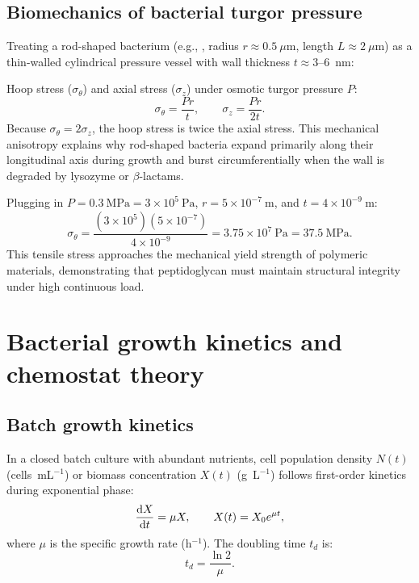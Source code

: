 \documentclass[12pt, a4paper, oneside]{report}
\begin{document}
\subsection{Biomechanics of bacterial turgor pressure}

Treating a rod-shaped bacterium (e.g., \Ecoli, radius $r \approx 0.5~\mu\text{m}$, length $L \approx 2~\mu\text{m}$) as a thin-walled cylindrical pressure vessel with wall thickness $t \approx 3$--$6$~nm:

Hoop stress ($\sigma_\theta$) and axial stress ($\sigma_z$) under osmotic turgor pressure $P$:
\begin{equation}
  \sigma_\theta = \frac{P r}{t}, \qquad \sigma_z = \frac{P r}{2t}.
  \label{eq:stress}
\end{equation}
Because $\sigma_\theta = 2\sigma_z$, the hoop stress is twice the axial stress. This mechanical anisotropy explains why rod-shaped bacteria expand primarily along their longitudinal axis during growth and burst circumferentially when the wall is degraded by lysozyme or $\beta$-lactams.

Plugging in $P = 0.3~\text{MPa} = 3 \times 10^5~\text{Pa}$, $r = 5 \times 10^{-7}~\text{m}$, and $t = 4 \times 10^{-9}~\text{m}$:
\[
  \sigma_\theta = \frac{(3\times 10^5)(5\times 10^{-7})}{4\times 10^{-9}} = 3.75 \times 10^7~\text{Pa} = 37.5~\text{MPa}.
\]
This tensile stress approaches the mechanical yield strength of polymeric materials, demonstrating that peptidoglycan must maintain structural integrity under high continuous load.

\section{Bacterial growth kinetics and chemostat theory}

\subsection{Batch growth kinetics}

In a closed batch culture with abundant nutrients, cell population density $N(t)$ (cells~mL$^{-1}$) or biomass concentration $X(t)$ (g~L$^{-1}$) follows first-order kinetics during exponential phase:
\begin{equation}
  \frac{\mathrm{d}X}{\mathrm{d}t} = \mu X, \qquad X(t) = X_0 e^{\mu t},
  \label{eq:exp_growth}
\end{equation}
where $\mu$ is the specific growth rate (h$^{-1}$). The doubling time $t_d$ is:
\begin{equation}
  t_d = \frac{\ln 2}{\mu}.
  \label{eq:doubling_time}
\end{equation}
\end{document}
